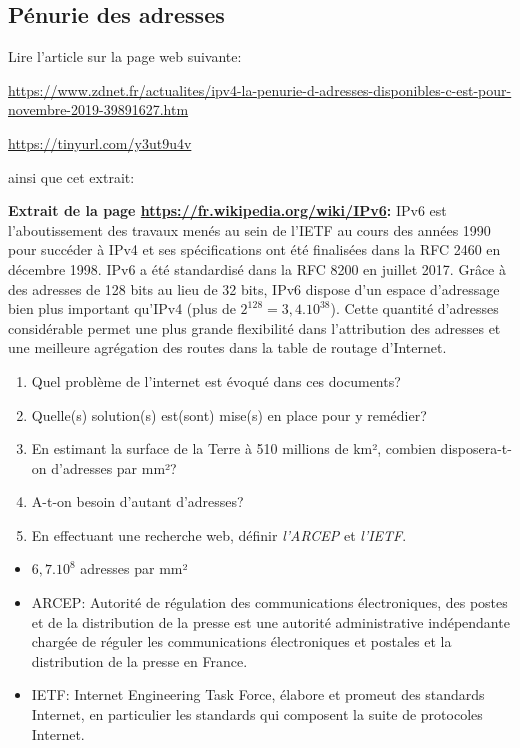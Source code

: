 \documentclass[a4paper,11pt]{article}
\begin{document}
\begin{Form}
\subsection{Pénurie des adresses}
Lire l'article sur la page web suivante:
\begin{center}
\begin{commentprof}
\url{https://www.zdnet.fr/actualites/ipv4-la-penurie-d-adresses-disponibles-c-est-pour-novembre-2019-39891627.htm}
\end{commentprof}
\url{https://tinyurl.com/y3ut9u4v}
\end{center}
ainsi que cet extrait:
\begin{framed}
\noindent\textbf{Extrait de la page \url{https://fr.wikipedia.org/wiki/IPv6}:} IPv6 est l'aboutissement des travaux menés au sein de l'IETF au cours des années 1990 pour succéder à IPv4 et ses spécifications ont été finalisées dans la RFC 2460 en décembre 1998. IPv6 a été standardisé dans la RFC 8200 en juillet 2017.
Grâce à des adresses de 128 bits au lieu de 32 bits, IPv6 dispose d'un espace d'adressage bien plus important qu'IPv4 (plus de $2^128 = 3,4.10^{38}$). Cette quantité d'adresses considérable permet une plus grande flexibilité dans l'attribution des adresses et une meilleure agrégation des routes dans la table de routage d'Internet.
\end{framed}
\begin{enumerate}
\item Quel problème de l'internet est évoqué dans ces documents?
\item Quelle(s) solution(s) est(sont) mise(s) en place pour y remédier?
\item En estimant la surface de la Terre à 510 millions de km², combien disposera-t-on d'adresses par mm²?
\item A-t-on besoin d'autant d'adresses?
\item En effectuant une recherche web, définir \emph{l'ARCEP} et \emph{l'IETF}.
\end{enumerate}
\begin{commentprof}
\begin{itemize}
\item $6,7.10^8$ adresses par mm²
\item ARCEP: Autorité de régulation des communications électroniques, des postes et de la distribution de la presse est une autorité administrative indépendante chargée de réguler les communications électroniques et postales et la distribution de la presse en France.
\item IETF: Internet Engineering Task Force, élabore et promeut des standards Internet, en particulier les standards qui composent la suite de protocoles Internet. 
\end{itemize}
\end{commentprof}

\end{Form}
\end{document}
